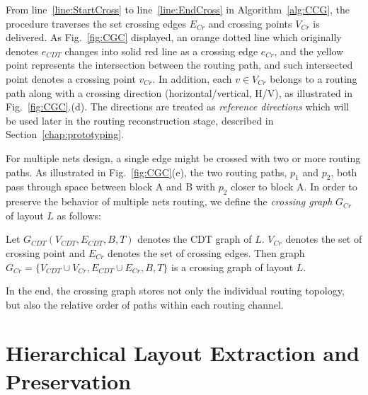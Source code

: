     From line~\ref{line:StartCross} to line~\ref{line:EndCross} in Algorithm~\ref{alg:CCG}, the procedure traverses the set crossing edges $E_{Cr}$ and crossing points $V_{Cr}$ is delivered. As Fig.~\ref{fig:CGC} displayed, an orange dotted line which originally denotes $e_{CDT}$ changes into solid red line as a crossing edge $e_{Cr}$, and the yellow point represents the intersection between the routing path, and such intersected point denotes a crossing point $v_{Cr}$. In addition, each $v \in V_{Cr}$ belongs to a routing path along with a crossing direction (horizontal/vertical, H/V), as illustrated in Fig.~\ref{fig:CGC}.(d). The directions are treated as {\it reference directions} which will be used later in the routing reconstruction stage, described in Section~\ref{chap:prototyping}. 



    For multiple nets design, a single edge might be crossed with two or more routing paths. As illustrated in Fig.~\ref{fig:CGC}(e), the two routing paths, $p_1$ and $p_2$, both pass through space between block A and B with $p_2$ closer to block A. In order to preserve the behavior of multiple nets routing, we define the {\it crossing graph} $G_{Cr}$ of layout $L$ as follows:
    \vspace{0.2cm}
    \begin{defi}\label{defi:CrossGraph}
      Let $G_{CDT}(V_{CDT},E_{CDT},B,T)$ denotes the CDT graph of $L$. $V_{Cr}$ denotes the set of crossing point and $E_{Cr}$ denotes the set of crossing edges. Then graph $G_{Cr} = \{V_{CDT} \cup V_{Cr},E_{CDT} \cup E_{Cr},B,T\}$ is a crossing graph of layout $L$. 
    \end{defi}
    \vspace{0.2cm}
    In the end, the crossing graph stores not only the individual routing topology, but also the relative order of paths within each routing channel.


  \section{Hierarchical Layout Extraction and Preservation}\label{subsec:HLE}

